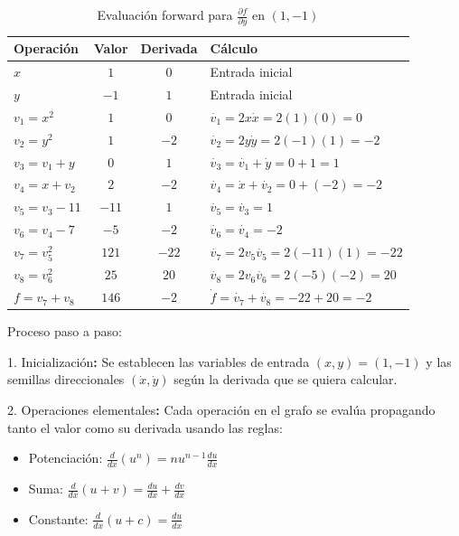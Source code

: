 \documentclass{article}
\begin{document}
\begin{table}[h]
\centering
\begin{tabular}{|l|c|c|l|}
\hline
\textbf{Operación} & \textbf{Valor} & \textbf{Derivada} & \textbf{Cálculo} \\
\hline
$x$ & $1$ & $0$ & Entrada inicial \\
$y$ & $-1$ & $1$ & Entrada inicial \\
\hline
$v_1 = x^2$ & $1$ & $0$ & $\dot{v_1} = 2x\dot{x} = 2(1)(0) = 0$ \\
$v_2 = y^2$ & $1$ & $-2$ & $\dot{v_2} = 2y\dot{y} = 2(-1)(1) = -2$ \\
\hline
$v_3 = v_1 + y$ & $0$ & $1$ & $\dot{v_3} = \dot{v_1} + \dot{y} = 0 + 1 = 1$ \\
$v_4 = x + v_2$ & $2$ & $-2$ & $\dot{v_4} = \dot{x} + \dot{v_2} = 0 + (-2) = -2$ \\
\hline
$v_5 = v_3 - 11$ & $-11$ & $1$ & $\dot{v_5} = \dot{v_3} = 1$ \\
$v_6 = v_4 - 7$ & $-5$ & $-2$ & $\dot{v_6} = \dot{v_4} = -2$ \\
\hline
$v_7 = v_5^2$ & $121$ & $-22$ & $\dot{v_7} = 2v_5\dot{v_5} = 2(-11)(1) = -22$ \\
$v_8 = v_6^2$ & $25$ & $20$ & $\dot{v_8} = 2v_6\dot{v_6} = 2(-5)(-2) = 20$ \\
\hline
$f = v_7 + v_8$ & $146$ & $-2$ & $\dot{f} = \dot{v_7} + \dot{v_8} = -22 + 20 = -2$ \\
\hline
\end{tabular}
\caption{Evaluación forward para $\frac{\partial f}{\partial y}$ en $(1,-1)$}
\end{table}

Proceso paso a paso:

1. Inicialización\textbf{:} Se establecen las variables de entrada $(x,y) = (1,-1)$ y las semillas direccionales $(\dot{x}, \dot{y})$ según la derivada que se quiera calcular.

2. Operaciones\textbf{ }elementales\textbf{:} Cada operación en el grafo se evalúa propagando tanto el valor como su derivada usando las reglas:
   \begin{itemize}
       \item Potenciación: $\frac{d}{dx}(u^n) = nu^{n-1}\frac{du}{dx}$
       \item Suma: $\frac{d}{dx}(u + v) = \frac{du}{dx} + \frac{dv}{dx}$
       \item Constante: $\frac{d}{dx}(u + c) = \frac{du}{dx}$
   \end{itemize}
\end{document}
